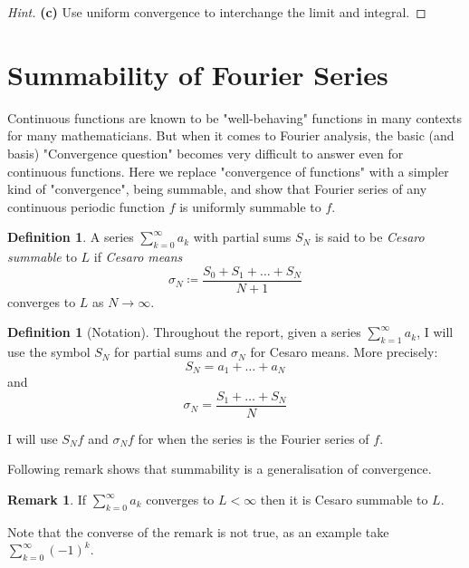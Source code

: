 \documentclass[12pt]{amsart}
\theoremstyle{definition}
\newtheorem{definition}[theorem]{Definition}
\newtheorem{remark}[theorem]{Remark}
\begin{document}
    \begin{proof}[Hint]
        \textbf{(c)} Use uniform convergence to interchange the limit and integral.
    \end{proof}


\section{Summability of Fourier Series}


Continuous functions are known to be "well-behaving" functions in many contexts for many mathematicians. But when it comes to Fourier analysis, the basic (and basis) "Convergence question" becomes very difficult to answer even for continuous functions. Here we replace "convergence of functions" with a simpler kind of "convergence", being summable, and show that Fourier series of any continuous periodic function \(f\) is uniformly summable to \(f\).


\begin{definition}
    A series $\sum_{k=0}^{\infty} a_k$ with partial sums $S_N$ is said to be \textit{Cesaro summable} to $L$ if \textit{Cesaro means}
    \[
    \sigma_N \coloneqq   \frac{S_0 + S_1 + \dots + S_N }{N+1}
    \]
    converges to $L$ as $N \longrightarrow \infty$.
\end{definition}


\begin{definition}[Notation]\label{notation}
    Throughout the report, given a series $\sum_{k=1}^{\infty}a_k$, I will use the symbol $S_N$ for partial sums and $\sigma_N$ for Cesaro means. More precisely:
\[
S_N = {a_1 + \dots + a_N}
\] and
\[
\sigma_N = \frac{S_1 + \dots + S_N}{N}
\]

I will use $S_Nf$ and $\sigma_Nf$ for when the series is the Fourier series of $f$.

\end{definition}

Following remark shows that summability is a generalisation of convergence.


\begin{remark}\label{convergence to the same value to the summable limit}
    If $\sum_{k=0}^{\infty} a_k$ converges to $L < \infty$ then it is Cesaro summable to $L$.
\end{remark}


Note that the converse of the remark is not true, as an example take $\sum_{k = 0}^{\infty} (-1) ^ k$.\par
\end{document}

